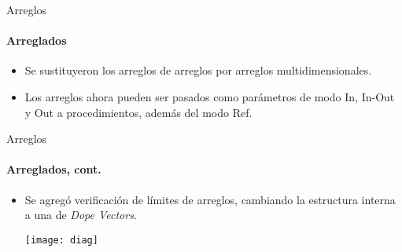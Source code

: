 \begin{frame}{Arreglos}
\framesubtitle{Arreglados}
\begin{itemize}
  \item Se sustituyeron los arreglos de arreglos por arreglos multidimensionales. \multidim{}

  \item Los arreglos ahora pueden ser pasados como parámetros de modo In, In-Out y Out a procedimientos, además del modo Ref. \inoutarr{}

\end{itemize}
\end{frame}
\begin{frame}{Arreglos}
\framesubtitle{Arreglados, cont.}
\begin{itemize}

  \item Se agregó verificación de límites de arreglos, cambiando la estructura interna a una de \textit{Dope Vectors}. \limits{} 

  \begin{center}
  \texttt{[image: diag]}
  \end{center}

\end{itemize}
\end{frame}


\cnfquant{
\begin{lstlisting}[language=graciela, style=code, escapechar=\~]
(% ~\qop~ i : int | 0 < i /\ i < 100 /\ (p(i) \/ q(i)) | ... %)
(% ~\qop~ x : float | x ~\Elem~ xs | ... %)
\end{lstlisting}
}

\countquant{
\begin{lstlisting}[language=graciela, style=code, escapechar=\~]
(% # i : T | R(i) | P(i) %)
\end{lstlisting}
}


